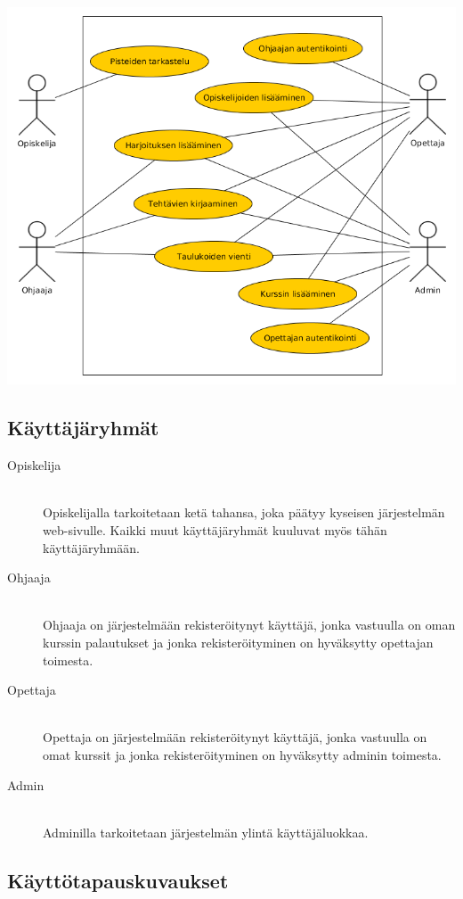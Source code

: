 \documentclass[a4paper,12pt, titlepage]{article}
\begin{document}
\includegraphics[scale=0.5]{kayttotapauskaavio}

\subsection{Käyttäjäryhmät}

\begin{description}
	\item[Opiskelija] \hfill \\
	Opiskelijalla tarkoitetaan ketä tahansa, joka päätyy kyseisen
	järjestelmän web-sivulle. Kaikki muut käyttäjäryhmät kuuluvat
	myös tähän käyttäjäryhmään.
	\item[Ohjaaja] \hfill \\
	Ohjaaja on järjestelmään rekisteröitynyt käyttäjä, jonka vastuulla
	on oman kurssin palautukset ja jonka rekisteröityminen on hyväksytty
	opettajan toimesta.\\
	\item[Opettaja] \hfill \\
	Opettaja on järjestelmään rekisteröitynyt käyttäjä, jonka
	vastuulla on omat kurssit ja jonka rekisteröityminen on hyväksytty
	adminin toimesta.
	\item[Admin] \hfill \\
	Adminilla tarkoitetaan järjestelmän ylintä käyttäjäluokkaa.
\end{description}

\subsection{Käyttötapauskuvaukset}
\end{document}
